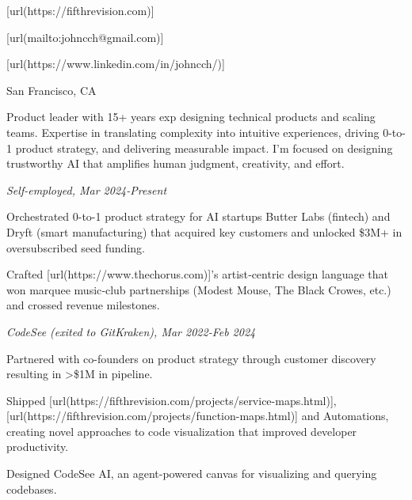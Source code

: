 \startsectionlevel[title={Chong Han Chua},reference={chong-han-chua}]

\startitemize[packed]
\item
  [url(https://fifthrevision.com)]
\item
  [url(mailto:johncch@gmail.com)]
\item
  [url(https://www.linkedin.com/in/johncch/)]
\item
  San Francisco, CA
\stopitemize

\stopsectionlevel

\startsectionlevel[title={Hello},reference={hello}]

Product leader with 15+ years exp designing technical products and
scaling teams. Expertise in translating complexity into intuitive
experiences, driving 0-to-1 product strategy, and delivering measurable
impact. I'm focused on designing trustworthy AI that amplifies human
judgment, creativity, and effort.

\stopsectionlevel

\startsectionlevel[title={Experience},reference={experience}]

\startsectionlevel[title={Fractional Head of Product &
Design},reference={fractional-head-of-product-design}]

{\em Self-employed, Mar 2024-Present}

\startitemize[packed]
\item
  Orchestrated 0-to-1 product strategy for AI startups Butter Labs
  (fintech) and Dryft (smart manufacturing) that acquired key customers
  and unlocked \$3M+ in oversubscribed seed funding.
\item
  Crafted [url(https://www.thechorus.com)]'s artist‑centric
  design language that won marquee music‑club partnerships (Modest
  Mouse, The Black Crowes, etc.) and crossed revenue milestones.
\stopitemize

\stopsectionlevel

\startsectionlevel[title={VP of Design},reference={vp-of-design}]

{\em CodeSee (exited to GitKraken), Mar 2022-Feb 2024}

\startitemize[packed]
\item
  Partnered with co-founders on product strategy through customer
  discovery resulting in >\$1M in pipeline.
\item
  Shipped [url(https://fifthrevision.com/projects/service-maps.html)],
  [url(https://fifthrevision.com/projects/function-maps.html)] and
  Automations, creating novel approaches to code visualization that
  improved developer productivity.
\item
  Designed CodeSee AI, an agent-powered canvas for visualizing and
  querying codebases.
\stopitemize

